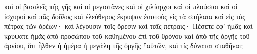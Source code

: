 \documentclass{openreader}
\begin{document}
καὶ οἱ βασιλεῖς τῆς γῆς καὶ οἱ μεγιστᾶνες καὶ οἱ χιλίαρχοι καὶ οἱ πλούσιοι καὶ οἱ ἰσχυροὶ καὶ πᾶς δοῦλος καὶ ἐλεύθερος ἔκρυψαν ἑαυτοὺς εἰς τὰ σπήλαια καὶ εἰς τὰς πέτρας τῶν ὀρέων· 
καὶ λέγουσιν τοῖς ὄρεσιν καὶ ταῖς πέτραις· Πέσετε ἐφ’ ἡμᾶς καὶ κρύψατε ἡμᾶς ἀπὸ προσώπου τοῦ καθημένου ἐπὶ τοῦ θρόνου καὶ ἀπὸ τῆς ὀργῆς τοῦ ἀρνίου, 
ὅτι ἦλθεν ἡ ἡμέρα ἡ μεγάλη τῆς ὀργῆς ⸀αὐτῶν, καὶ τίς δύναται σταθῆναι; 
\end{document}
